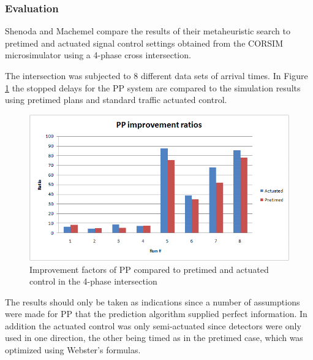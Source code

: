 \subsubsection*{Evaluation}

Shenoda and Machemel compare the results of their metaheuristic
search to pretimed and actuated signal control settings obtained from
the CORSIM microsimulator using a 4-phase cross intersection.


The intersection was subjected to 8 different data sets of arrival
times. In Figure \ref{fig:pp_improvements} the stopped delays for the
PP system are compared to the simulation results using pretimed plans
and standard traffic actuated control.

\begin{figure}[!ht]
\begin{center}
\includegraphics[scale=0.35]{phase-by-phase_improvement_ratios.png} 
\end{center}
\caption{Improvement factors of PP compared to pretimed and actuated control in the 4-phase intersection}
\label{fig:pp_improvements}
\end{figure}

The results should only be taken as indications since a number of
assumptions were made for PP that the prediction algorithm supplied
perfect information. In addition the actuated control was only
semi-actuated since detectors were only used in one direction, the
other being timed as in the pretimed case, which was optimized using
Webster's formulas.

